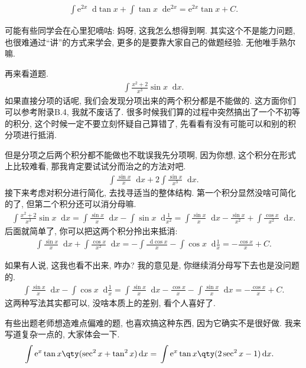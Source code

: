 \documentclass{ctexbook}
\newcommand{\e}{\mathrm{e}}
\newcommand*{\dif}{\mathop{}\!\mathrm{d}}
\begin{document}
{\begin{align*}
\int\e^{2x}\dif{\tan{x}}+\int\tan{x}\dif{\e^{2x}}=\e^{2x}\tan{x}+C
.\end{align*}\par
可能有些同学会在心里犯嘀咕: 妈呀, 这我怎么想得到啊. 其实这个不是能力问题, 也很难通过“讲”的方式来学会, 更多的是要靠大家自己的做题经验. 无他唯手熟尔嘛. \par
再来看道题. 
\begin{align*}
\int\frac{x^{2}+2}{x^{3}}\sin{x}\dif{x}
.\end{align*}
如果直接分项的话呢, 我们会发现分项出来的两个积分都是不能做的. 这方面你们可以参考附录B.4, 我就不废话了. 很多时候我们算的过程中突然搞出了一个不初等的积分, 这个时候一定不要立刻怀疑自己算错了, 先看看有没有可能可以和别的积分项进行抵消. \par
但是分项之后两个积分都不能做也不耽误我先分项啊, 因为你想, 这个积分在形式上比较难看, 那我肯定要试试分而治之的方法对吧. 
\begin{align*}
\int\frac{\sin{x}}{x}\dif{x}+2\int\frac{\sin{x}}{x^{3}}\dif{x}
.\end{align*}
接下来考虑对积分进行简化, 去找寻适当的整体结构. 第一个积分显然没啥可简化的了, 但第二个积分还可以消分母嘛. 
\begin{align*}
\int\frac{x^{2}+2}{x^{3}}\sin{x}\dif{x}=\int\frac{\sin{x}}{x}\dif{x}-\int\sin{x}\dif{\frac{1}{x^{2}}}=\int\frac{\sin{x}}{x}\dif{x}-\frac{\sin{x}}{x^{2}}+\int\frac{\cos{x}}{x^{2}}\dif{x}
.\end{align*}
后面就简单了, 你可以把这两个积分拎出来抵消: 
\begin{align*}
\int\frac{\sin{x}}{x}\dif{x}+\int\frac{\cos{x}}{x^{2}}\dif{x}=-\int\frac{\dif{\cos{x}}}{x}-\int\cos{x}\dif{\frac{1}{x}}=-\frac{\cos{x}}{x}+C
.\end{align*}\par
如果有人说, 这我也看不出来, 咋办? 我的意见是, 你继续消分母写下去也是没问题的. 
\begin{align*}
\int\frac{\sin{x}}{x}\dif{x}-\int\cos{x}\dif{\frac{1}{x}}=\int\frac{\sin{x}}{x}\dif{x}-\frac{\cos{x}}{x}-\int\frac{\sin{x}}{x}\dif{x}=-\frac{\cos{x}}{x}+C
.\end{align*}
这两种写法其实都可以, 没啥本质上的差别, 看个人喜好了. \par
有些出题老师想造难点偏难的题, 也喜欢搞这种东西, 因为它确实不是很好做. 我来写道复杂一点的, 大家体会一下. 
\begin{align*}
\int\e^{x}\tan{x}\qty(\sec^{2}{x}+\tan^{2}{x})\dif{x}={}&\int\e^{x}\tan{x}\qty(2\sec^{2}{x}-1)\dif{x}
.\end{align*}
}
\end{document}
